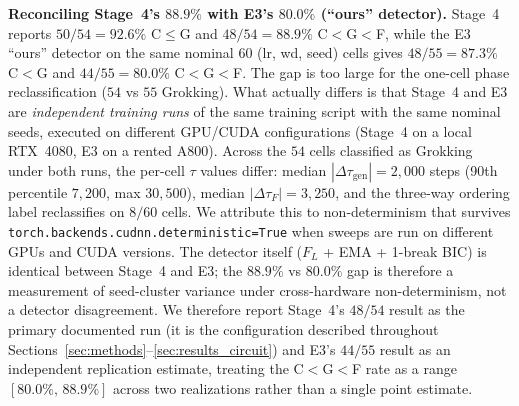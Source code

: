 \documentclass{article}
\newcommand{\taug}{\tau_{\mathrm{gen}}}
\newcommand{\tauf}{\tau_{F}}
\newcommand{\flogit}{F_{L}}
\begin{document}
\textbf{Reconciling Stage~4's $88.9\%$ with E3's $80.0\%$
(``ours'' detector).}
Stage~4 reports $50/54{=}92.6\%$ C$\leq$G and
$48/54{=}88.9\%$ C$<$G$<$F, while the E3 ``ours'' detector
on the same nominal $60$ (lr, wd, seed) cells gives
$48/55{=}87.3\%$ C$<$G and $44/55{=}80.0\%$ C$<$G$<$F.
The gap is too large for the one-cell phase reclassification
($54$ vs $55$ Grokking).
What actually differs is that Stage~4 and E3 are
\emph{independent training runs} of the same training script with
the same nominal seeds, executed on different GPU/CUDA
configurations (Stage~4 on a local RTX~4080, E3 on a rented A800).
Across the $54$ cells classified as Grokking under both runs, the
per-cell $\tau$ values differ: median $|\Delta\taug|=2{,}000$
steps (90th percentile $7{,}200$, max $30{,}500$), median
$|\Delta\tauf|=3{,}250$, and the three-way ordering label
reclassifies on $8/60$ cells.
We attribute this to non-determinism that survives
\texttt{torch.backends.cudnn.deterministic=True} when sweeps are
run on different GPUs and CUDA versions.
The detector itself ($\flogit$ + EMA + 1-break BIC) is identical
between Stage~4 and E3; the $88.9\%$ vs $80.0\%$ gap is therefore
a measurement of seed-cluster variance under cross-hardware
non-determinism, not a detector disagreement.
We therefore report Stage~4's $48/54$ result as the primary
documented run (it is the configuration described throughout
Sections~\ref{sec:methods}--\ref{sec:results_circuit}) and E3's
$44/55$ result as an independent replication estimate, treating
the C$<$G$<$F rate as a range $[80.0\%,\,88.9\%]$ across two
realizations rather than a single point estimate.
\end{document}
